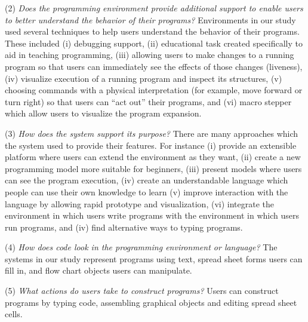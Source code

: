 (2) \textit{Does the programming environment provide additional support to enable users to better understand the behavior of their programs?} Environments in our study used several techniques to help users understand the behavior of their programs. These included (i) debugging support, (ii) educational task created specifically to aid in teaching programming, (iii) allowing users to make changes to a running program so that users can immediately see the effects of those changes (liveness), (iv) visualize execution of a running program and inspect its structures, (v) choosing commands with a physical interpretation (for example, move forward or turn right) so that users can “act out” their programs, and (vi) macro stepper which allow users to visualize the program expansion.

(3) \textit{How does the system support its purpose?} There are many approaches which the system used to provide their features. For instance (i) provide an extensible platform where users can extend the environment as they want, (ii) create a new programming model more suitable for beginners, (iii) present models where users can see the program execution, (iv) create an understandable language which people can use their own knowledge to learn (v) improve interaction with the language by allowing rapid prototype and visualization, (vi) integrate the environment in which users write programs with the environment in which users run programs, and (iv) find alternative ways to typing programs.

(4) \textit{How does code look in the programming environment or language?} The systems in our study represent programs using text, spread sheet forms users can fill in, and flow chart objects users can manipulate.

(5) \textit{What actions do users take to construct programs?} Users can construct programs by typing code, assembling graphical objects and editing spread sheet cells.

